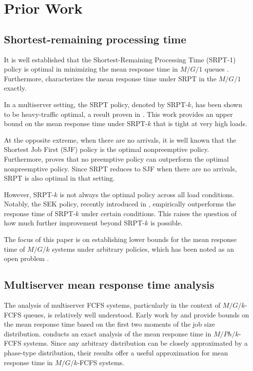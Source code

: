 \section{Prior Work}
\label{sec:prior_work}

\subsection{Shortest-remaining processing time}
It is well established that the Shortest-Remaining Processing Time (SRPT-1) policy is optimal in minimizing the mean response time in $M/G/1$ queues  \citep{Schrage1968Proof}. Furthermore, \cite{Schrage1966} characterizes the mean response time under SRPT in the $M/G/1$ exactly. 

In a multiserver setting, the SRPT policy, denoted by SRPT-$k$, has been shown to be heavy-traffic optimal, a result proven in \cite{Grosof2018}. This work provides an upper bound on the mean response time under SRPT-$k$ that is tight at very high loads.

At the opposite extreme, when there are no arrivals, it is well known that the Shortest Job First (SJF) policy is the optimal nonpreemptive policy. Furthermore, \cite{McNaughton1959} proves that no preemptive policy can outperform the optimal nonpreemptive policy. Since SRPT reduces to SJF when there are no arrivals, SRPT is also optimal in that setting.

However, SRPT-$k$ is not always the optimal policy across all load conditions. Notably, the SEK policy, recently introduced in \cite{Grosof2024BoMS}, empirically outperforms the response time of SRPT-$k$ under certain conditions. This raises the question of how much further improvement beyond SRPT-$k$ is possible.

The focus of this paper is on establishing lower bounds for the mean response time of $M/G/k$ systems under arbitrary policies, which has been noted as an open problem \citep{Grosof2019Open}.

\subsection{Multiserver mean response time analysis}
The analysis of multiserver FCFS systems, particularly in the context of $M/G/k$-FCFS queues, is relatively well understood. Early work by \cite{Kingman1970} and \cite{Daley1998} provide bounds on the mean response time based on the first two moments of the job size distribution. \cite{Harchol-Balter2005} conducts an exact analysis of the mean response time in $M/Ph/k$-FCFS systems. Since any arbitrary distribution can be closely approximated by a phase-type distribution, their results offer a useful approximation for mean response time in $M/G/k$-FCFS systems. 

